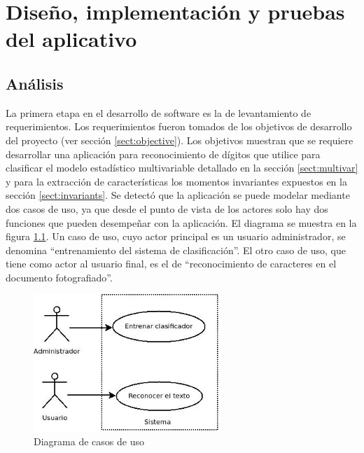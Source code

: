 \documentclass[a4paper, 11pt, oneside]{report}
\begin{document}
\chapter{Diseño, implementación y pruebas del aplicativo}
\label{chap:ingSw}

\section{Análisis}

La primera etapa en el desarrollo de software es la de levantamiento de requerimientos. Los requerimientos fueron tomados de los objetivos de desarrollo del proyecto (ver sección \ref{sect:objective}). Los objetivos muestran que se requiere desarrollar una aplicación para reconocimiento de dígitos que utilice para clasificar el modelo estadístico multivariable detallado en la sección \ref{sect:multivar} y para la extracción de características los momentos invariantes expuestos en la sección \ref{sect:invariants}.\newline \newline
Se detectó que la aplicación se puede modelar mediante dos casos de uso, ya que desde el punto de vista de los actores solo hay dos funciones que pueden desempeñar con la aplicación. El diagrama se muestra en la figura \ref{fig:useCase}. Un caso de uso, cuyo actor principal es un usuario administrador, se denomina ``entrenamiento del sistema de clasificación''. El otro caso de uso, que tiene como actor al usuario final, es el de ``reconocimiento de caracteres en el documento fotografiado''.

\begin{figure}[htb]
\begin{center}
\leavevmode
\includegraphics[width=7cm]{diagrams/casoUso.jpg}
\end{center}
\caption{Diagrama de casos de uso}
\label{fig:useCase}
\end{figure}
\end{document}
